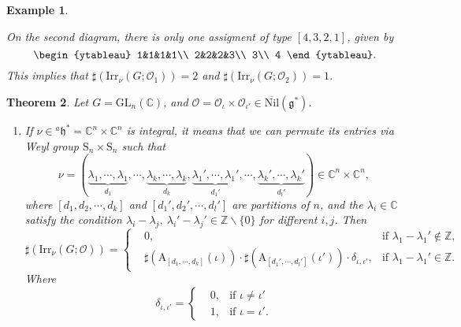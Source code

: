 \documentclass[12pt, a4paper]{amsart}
\numberwithin{equation}{section}
\newtheorem{thm}{Theorem}[section]
\newtheorem{examp}[thm]{Example}
\newcommand{\BC}{{\mathbb {C}}}
\newcommand{\BZ}{{\mathbb {Z}}}
\newcommand{\CO}{{\mathcal {O}}}
\newcommand{\fg}{\mathfrak{g}}
\newcommand{\fh}{\mathfrak{h}}
\newcommand{\GL}{{\mathrm{GL}}}
\newcommand{\A}{{\mathrm{A}}}
\newcommand{\Irr}{{\mathrm{Irr}}}
\newcommand{\Nil}{{\mathrm{Nil}}}
\renewcommand{\bar}{\overline}
\begin{document}
\begin{examp}
\begin{enumerate}
            On the second diagram, there is only one assigment of type $[4,3,2,1]$, given by
            \[
                \begin{ytableau}
                    1&1&1&1\\
                    2&2&2&3\\
                    3\\
                    4
                \end{ytableau}.
            \]
            This implies that $\sharp(\Irr_{\nu}(G;\CO_1)) = 2$ and $\sharp(\Irr_{\nu}(G;\CO_2)) = 1$.
    \end{enumerate}
\end{examp}


\begin{thm}\label{C}
    Let $G = \GL_{n}(\BC)$, and $\CO = \CO_{\iota} \times \CO_{\iota'} \in \bar{\Nil}(\fg^*)$.
    \begin{enumerate}
        \item If $\nu \in {^a\fh^*} = \BC^n \times \BC^n$ is integral, it means that we can permute its entries via Weyl group $\mathrm{S}_n \times \mathrm{S}_n$ such that
        \[
        \nu =  (\underbrace{\lambda_1, \cdots, \lambda_1}_{d_1}, \cdots, \underbrace{\lambda_k, \cdots, \lambda_k}_{d_k}, \underbrace{\lambda_1', \cdots, \lambda_1'}_{d_1'}, \cdots, \underbrace{\lambda_k', \cdots, \lambda_k'}_{d_{l}'} ) \in \BC^n \times \BC^n, 
        \]
        where $[d_1,d_2,\cdots,d_k]$ and $[d_1',d_2',\cdots,d_l']$ are partitions of $n$, and the $\lambda_i \in \BC$ satisfy the condition $\lambda_i - \lambda_j, \ \lambda_i' - \lambda_j' \in \BZ \backslash \{0\}$ for different $i,j$. Then
        \begin{equation}
            \sharp(\Irr_{\nu}(G;\CO)) = \left\{ 
            \begin{aligned}
                &0, & \textrm{if $\lambda_1 - \lambda_1' \notin \BZ$},\\
                &\sharp(\A_{[d_1,\cdots,d_k]}(\iota)) \cdot \sharp(\A_{[d_1',\cdots,d_l']}(\iota')) \cdot \delta_{\iota,\iota'} , & \textrm{if $\lambda_1 - \lambda_1' \in \BZ$}.
            \end{aligned}
            \right.
        \end{equation}
        Where $$\delta_{\iota,\iota'} = \left\{
        \begin{aligned}
            &0, & \textrm{if $\iota \neq  \iota'$}\\
            &1, & \textrm{if $\iota = \iota'$}.
        \end{aligned}
$$
\end{enumerate}
\end{thm}
\end{document}
